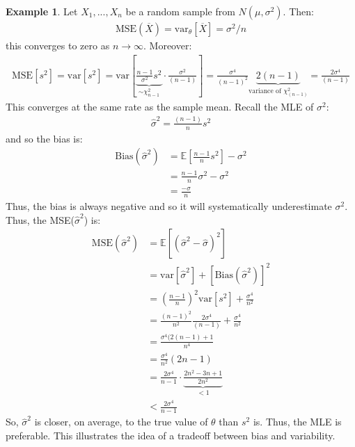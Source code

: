 \documentclass[11pt]{scrartcl}
\theoremstyle{definition}
\newtheorem{ex}{Example}
\theoremstyle{remark}
\newcommand{\EX}[1]{\mathbb{E}\left[#1 \right]}
\begin{document}
\begin{ex} 
	Let $X_1, ..., X_n$ be a random sample from $N(\mu, \sigma^2)$. Then: 
	\begin{align*}
		\text{MSE}(\overline{X}) = \text{var}_\theta[\overline{X}] = \sigma^2 / n 	
	\end{align*}
	this converges to zero as $ n \rightarrow \infty$. Moreover: 
	\begin{align*}
		\text{MSE}[s^2] = \text{var}[s^2] = \text{var}\left[ \underbrace{ \frac{n-1}{\sigma^2} s^2}_{\sim \chi_{n-1}^2} \cdot \frac{\sigma^2}{(n-1)}	\right] 	= \frac{\sigma^4}{(n-1)^2} \underbrace{2(n-1)}_{\text{variance of } \chi_{(n-1)}^2} = \frac{2\sigma^4}{(n-1)}
	\end{align*}
	This converges at the same rate as the sample mean. Recall the MLE of $\sigma^2$: 
	\begin{align*}
		\hat{\sigma}^2 = \frac{(n-1)}{n} s^2	
	\end{align*}
	and so the bias is: 
	\begin{align*}
		\text{Bias}(\hat{\sigma}^2) & = \EX{\frac{n-1}{n	} s^2}  - \sigma^2 \\
			 & = \frac{n-1}{n} \sigma^2 - \sigma^2 \\
			 & = \frac{-\sigma}{n} 	
	\end{align*}
	Thus, the bias is always negative and so it will systematically underestimate $\sigma^2$. Thus, the MSE($\hat{\sigma}^2$) is: 
	\begin{align*}
		\text{MSE}(\hat{\sigma}^2) & =  \EX{(\hat{\sigma}^2 - \hat{\sigma})^2}  	\\
		 & = \text{var}[\hat{\sigma}^2] + [\text{Bias}(\hat{\sigma}^2)]^2 \\
		 & = \left( \frac{n-1}{n} \right)^2 \text{var}[s^2] + \frac{\sigma^4}{n^2} \\
		 & = \frac{(n-1)^2}{n^2} \frac{2 \sigma^4}{(n-1)} + \frac{\sigma^4}{n^2} \\
		 & = \frac{\sigma^4(2(n-1)+1}{n^4} \\
		 & = \frac{\sigma^4}{n^2} (2n-1) \\
		 & = \frac{2 \sigma^4}{n-1} \cdot \underbrace{\frac{2n^2 - 3n +1}{2n^2}}_{< 1} \\
		 & < \frac{2 \sigma^4}{n-1}
	\end{align*}
	So, $\hat{\sigma}^2$ is closer, on average, to the true value of $\theta$ than $s^2$ is. Thus, the MLE is preferable. This illustrates the idea of a tradeoff between bias and variability. 
\end{ex}
\end{document}
